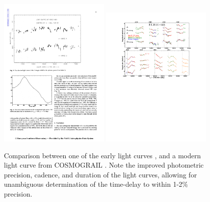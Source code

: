 \begin{figure}
\includegraphics[width=0.48\textwidth]{figures/Vanderriest89_fig5.pdf}
\includegraphics[width=0.48\textwidth]{figures/Tewes13-fig4.pdf}
\caption{Comparison between one of the early light curves \citep[left
panel, from][]{Van89}, and a modern light curve from COSMOGRAIL
\citep[right panel, from][]{Tew++13}. Note the improved photometric
precision, cadence, and duration of the light curves, allowing for
unambiguous determination of the time-delay to within 1-2\% precision.}
\label{fig:oldvsmoderndt}
\end{figure}

